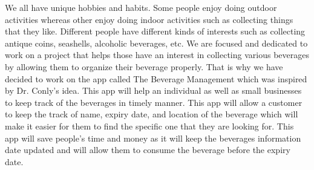 We all have unique hobbies and habits. Some people enjoy doing outdoor activities whereas other enjoy doing indoor activities such as collecting things that they like. Different people have different kinds of interests such as collecting antique coins, seashells, alcoholic beverages, etc. We are focused and dedicated to work on a project that helps those have an interest in collecting various beverages by allowing them to organize their beverage properly. That is why we have decided to work on the app called The Beverage Management which was inspired by Dr. Conly's idea. This app will help an individual as well as small businesses to keep track of the beverages in timely manner. This app will allow a customer to keep the track of name, expiry date, and location of the beverage which will make it easier for them to find the specific one that they are looking for. This app will save people's time and money as it will keep the beverages information date updated and will allow them to consume the beverage before the expiry date.